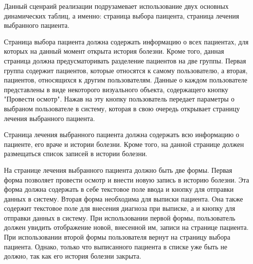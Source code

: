\documentclass[12pt, a4paper]{article}
\begin{document}
    Данный сценраий реализации подрузамевает использование двух основных динамических таблиц, а именно: страница выбора паицента, страница лечения выбранного пациента.
    
    Страница выбора пациента должна содержать информацию о всех пациентах, для которых на данный момент открыта история болезни. Кроме того, данная страница должна предусматоривать разделение пациентов на две группы. Первая группа содержит пациентов, которые относятся к самому пользователю, а вторая, пациентов, относящихся к другим пользователям. Данные о каждом пользователе представлены в виде некоторого визуального объекта, содержащего кнопку "Провести осмотр". Нажав на эту кнопку пользователь передает параметры о выбраном пользователе в систему, которая в свою очередь открывает страницу лечения выбранного пациента.
    
    Страница лечения выбранного пациента должна содержать всю информацию о пациенте, его враче и истории болезни. Кроме того, на данной странице должен размещаться список записей в истории болезни.
    
    На странице лечения выбранного пациента должно быть две формы. Первая форма позволяет провести осмотр и внести новую запись в историю болезни. Эта форма должна содержать в себе текстовое поле ввода и кнопку для отправки данных в систему. Вторая форма необходима для выписки пациента. Она также содержит текстовое поле для внесения диагноза при выписке, а и кнопку для отправки данных в систему. При использовании первой формы, пользователь должен увидить отображение новой, внесенной им, записи на странице пациента. При использовании второй формы пользователя вернут на страницу выбора пациента. Однако, только что выписанного пациента в списке уже быть не должно, так как его история болезни закрыта.

    \newpage
\end{document}
